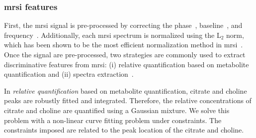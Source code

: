 \documentclass[a4paper,num-refs]{wiley-article}
\begin{document}






\subsubsection{\ac{mrsi} features}

First, the \ac{mrsi} signal is pre-processed by correcting the
phase~\cite{Chen2002}, baseline~\cite{xi2008baseline}, and
frequency~\cite{Parfait2012}. Additionally, each \ac{mrsi} spectrum is
normalized using the L$_2$ norm, which has been shown to be the most efficient
normalization method in \ac{mrsi}~\cite{Parfait2012}.  Once the signal are
pre-processed, two strategies are commonly used to extract discriminative
features from \ac{mrsi}: (i) relative quantification based on metabolite
quantification and (ii) spectra extraction~\cite{Parfait2012}.

In \emph{relative quantification} based on metabolite quantification, citrate
and choline peaks are robustly fitted and integrated. Therefore, the relative
concentrations of citrate and choline are quantified using a Gaussian
mixture. We solve this problem with a non-linear curve fitting problem under
constraints. The constraints imposed are related to the peak location of the
citrate and choline.
\end{document}
